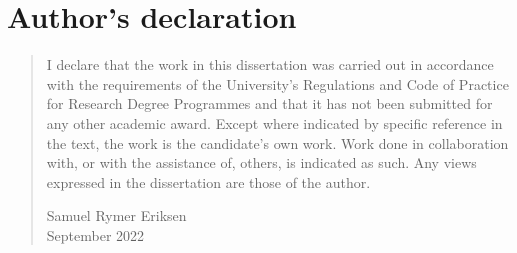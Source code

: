%
%
%
%
%
%
\chapter*{Author's declaration}
\begin{SingleSpace}
\begin{quote}
I declare that the work in this dissertation was carried out in accordance with the requirements of  the University's Regulations and Code of Practice for Research Degree Programmes and that it has not been submitted for any other academic award. Except where indicated by specific  reference in the text, the work is the candidate's own work. Work done in collaboration with, or with the assistance of, others, is indicated as such. Any views expressed in the dissertation are those of the author.

\begin{flushright}
Samuel Rymer Eriksen \\
September 2022
\end{flushright}


\end{quote}
\end{SingleSpace}
\clearpage